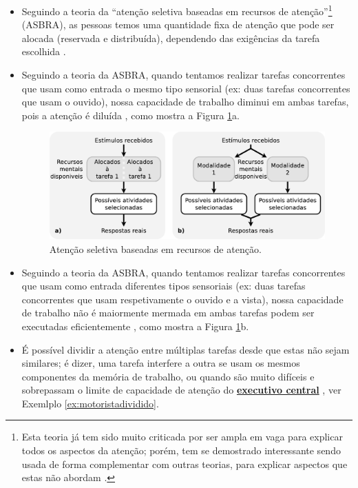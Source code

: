 \begin{itemize}
\item Seguindo a teoria da 
``atenção seletiva baseadas em recursos de atenção''\footnote{\label{footnote:ASBRA} Esta
teoria já tem sido muito criticada por ser ampla em vaga para explicar todos os aspectos da atenção;
porém, tem se demostrado interessante sendo usada de forma complementar com outras teorias,
para explicar aspectos que estas não abordam \cite[pp. 139-140]{sternbergpsicologia}.} (ASBRA),
as pessoas temos uma quantidade fixa de atenção que pode ser alocada (reservada e distribuída),
dependendo das exigências da tarefa escolhida
\cite[pp. 139]{sternbergpsicologia}  \cite{navon1979economy}.

\item Seguindo a teoria da ASBRA, 
quando tentamos realizar  tarefas concorrentes que usam como entrada o mesmo tipo sensorial 
(ex: duas tarefas concorrentes que usam o ouvido),
nossa capacidade de trabalho diminui em ambas tarefas, pois a atenção é diluída 
\cite[pp. 139]{sternbergpsicologia}  \cite{navon1979economy},
como mostra a  Figura \ref{fig:memory-attention}a.
\begin{figure}[!h]
  \centering
    \includegraphics[width=\textwidth]{chapters/cap-learning/memory-attention.eps}
\caption{Atenção seletiva baseadas em recursos de atenção.}
\label{fig:memory-attention}
\end{figure}

\item Seguindo a teoria da ASBRA, 
quando tentamos realizar  tarefas concorrentes que usam como entrada diferentes tipos sensoriais 
(ex: duas tarefas concorrentes que usam respetivamente o ouvido e a vista),
nossa capacidade de trabalho não é maiormente mermada em ambas tarefas podem ser executadas eficientemente 
\cite[pp. 139, 140]{sternbergpsicologia} \cite{navon1979economy},
como mostra a  Figura \ref{fig:memory-attention}b.

\item É possível dividir a atenção entre múltiplas tarefas desde que estas não sejam similares;
é dizer, uma tarefa interfere a outra se usam os mesmos componentes da memória de trabalho,
ou quando são muito difíceis e sobrepassam o limite de capacidade de atenção do 
\hyperref[reflabel:executivocentral]{\textbf{executivo central}} 
\cite[pp. 108]{pake2019psicologia} \cite[pp. 190]{eysenck2017manual}, 
ver Exemlplo \ref{ex:motoristadividido}.


\end{itemize}
